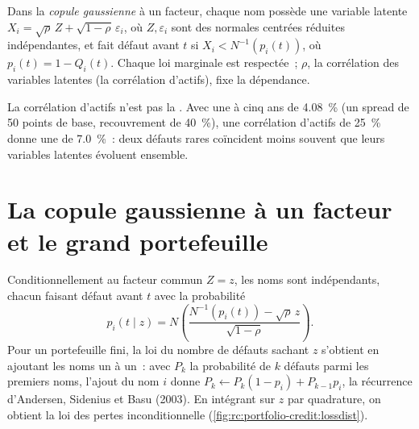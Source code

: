 \begin{definition}\label{def:rc:portfolio-credit:gauss}
Dans la \emph{copule gaussienne} à un facteur, chaque nom possède une
variable latente $X_i = \sqrt\rho\,Z+\sqrt{1-\rho}\,\varepsilon_i$, où $Z,\varepsilon_i$ sont
des normales centrées réduites indépendantes, et fait défaut avant $t$ si $X_i < N^{-1}(p_i(t))$, où $p_i(t) = 1-Q_i(t)$.
Chaque loi marginale est respectée~; $\rho$, la corrélation des variables
latentes (la corrélation d'actifs), fixe la dépendance.
\end{definition}

La corrélation d'actifs n'est pas la . Avec une  à cinq ans
de 4.08~\% (un spread de 50 points de base, recouvrement de 40~\%), une corrélation d'actifs de 25~\% donne une
 de 7.0~\%~: deux défauts rares coïncident moins souvent que leurs
variables latentes évoluent ensemble.

\section{La copule gaussienne à un facteur et le grand portefeuille}

Conditionnellement au facteur commun $Z = z$, les noms sont indépendants, chacun faisant défaut avant $t$
avec la probabilité
\[
p_i(t\mid z) = N\!\left(\frac{N^{-1}(p_i(t))-\sqrt\rho\,z}{\sqrt{1-\rho}}\right).
\]
Pour un portefeuille fini, la loi du nombre de défauts sachant $z$ s'obtient en ajoutant les noms
un à un~: avec $P_k$ la probabilité de $k$ défauts parmi les premiers noms,
l'ajout du nom $i$ donne $P_k \leftarrow P_k(1-p_i)+P_{k-1}p_i$, la récurrence d'Andersen, Sidenius et
Basu (2003). En intégrant sur $z$ par quadrature, on obtient la loi des pertes inconditionnelle
(\cref{fig:rc:portfolio-credit:lossdist}).

\label{lst:rc:portfolio-credit:recursion}

